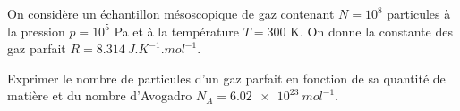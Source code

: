 




\hauteurLargeurCadreReponse		{8mm}{7cm}
\typeEntrainement				{} %
\initialisationEntrainement

On considère un échantillon mésoscopique de gaz contenant $N=10^8$ particules à la pression $p=10^5$ Pa et à la température $T=300$ K. On donne la constante des gaz parfait $R=\SI{8,314}{J.K^{-1}.mol^{-1}}$. \\

\debutEntrainement




\begin{enonce}
Exprimer le nombre de particules d'un gaz parfait en fonction de sa quantité de matière et du nombre d'Avogadro $N_A=\SI{6,02e23}{mol^{-1}}$.
\end{enonce}







